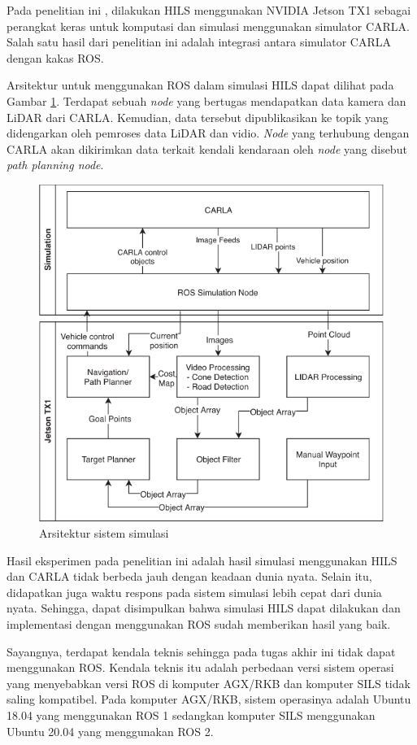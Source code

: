 Pada penelitian ini \parencite{brogle_CarlaHILS}, dilakukan HILS menggunakan
NVIDIA Jetson TX1 sebagai perangkat keras untuk komputasi dan simulasi
menggunakan simulator CARLA. Salah satu hasil dari penelitian ini adalah
integrasi antara simulator CARLA dengan kakas ROS.

Arsitektur untuk menggunakan ROS dalam simulasi HILS dapat dilihat pada Gambar
\ref{chapter-2-carla-jetson-arch}. Terdapat sebuah \textit{node}  yang
bertugas mendapatkan data kamera dan LiDAR dari CARLA. Kemudian, data tersebut
dipublikasikan ke topik yang didengarkan oleh pemroses data LiDAR dan vidio.
\textit{Node} yang terhubung dengan CARLA akan dikirimkan data terkait kendali
kendaraan oleh \textit{node} yang disebut \textit{path planning node}.

\begin{figure}[h!]
	\centering
	\includegraphics[width=1.0\textwidth]{resources/chapter-2/carla-jetson-arch.png}
	\caption{Arsitektur sistem simulasi \parencite{brogle_CarlaHILS}}
	\label{chapter-2-carla-jetson-arch}
\end{figure}

Hasil eksperimen pada penelitian ini adalah hasil simulasi menggunakan HILS dan
CARLA tidak berbeda jauh dengan keadaan dunia nyata. Selain itu, didapatkan juga
waktu respons pada sistem simulasi lebih cepat dari dunia nyata. Sehingga, dapat
disimpulkan bahwa simulasi HILS dapat dilakukan dan implementasi dengan
menggunakan ROS sudah memberikan hasil yang baik.

Sayangnya, terdapat kendala teknis sehingga pada tugas akhir ini tidak dapat
menggunakan ROS. Kendala teknis itu adalah perbedaan versi sistem operasi yang
menyebabkan versi ROS di komputer AGX/RKB dan komputer SILS tidak saling
kompatibel. Pada komputer AGX/RKB, sistem operasinya adalah Ubuntu 18.04 yang
menggunakan ROS 1 sedangkan komputer SILS menggunakan Ubuntu 20.04 yang
menggunakan ROS 2.
